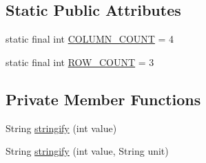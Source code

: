 \subsection*{Static Public Attributes}
\begin{DoxyCompactItemize}
\item 
static final int \hyperlink{classcom_1_1qualoutdoor_1_1recorder_1_1telephony_1_1ViewCellInfo_af6b0947b2c8f01e27c6b16c5f11063dc}{C\-O\-L\-U\-M\-N\-\_\-\-C\-O\-U\-N\-T} = 4
\item 
static final int \hyperlink{classcom_1_1qualoutdoor_1_1recorder_1_1telephony_1_1ViewCellInfo_a6bc2da31e8016dcce55517756d9c00aa}{R\-O\-W\-\_\-\-C\-O\-U\-N\-T} = 3
\end{DoxyCompactItemize}
\subsection*{Private Member Functions}
\begin{DoxyCompactItemize}
\item 
String \hyperlink{classcom_1_1qualoutdoor_1_1recorder_1_1telephony_1_1ViewCellInfo_a5d8137a390903d825ae1c61c8adf8194}{stringify} (int value)
\item 
String \hyperlink{classcom_1_1qualoutdoor_1_1recorder_1_1telephony_1_1ViewCellInfo_a144cd5897da056aff8a4ef1ee1069927}{stringify} (int value, String unit)
\end{DoxyCompactItemize}
